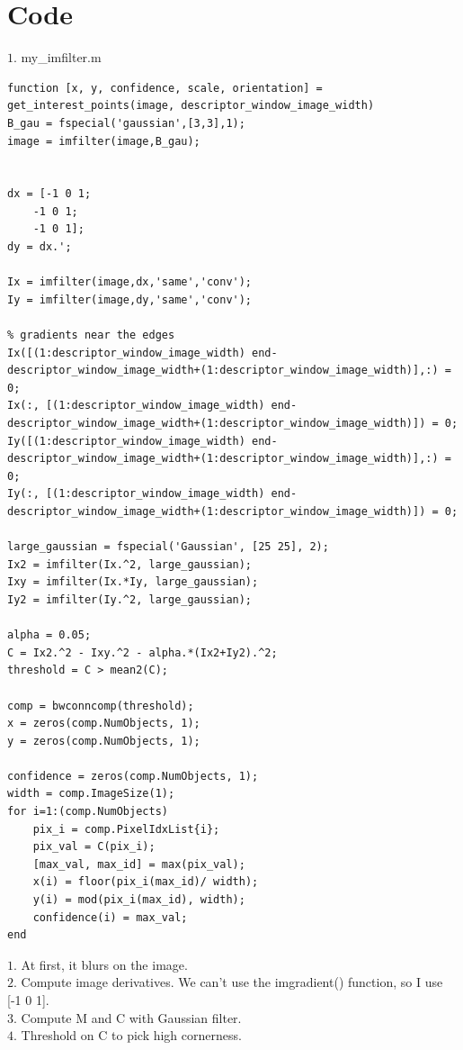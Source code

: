 \section*{Code}
{\large $1.$ my\_imfilter.m \par}
\begin{lstlisting}[style=Matlab-editor]
function [x, y, confidence, scale, orientation] = get_interest_points(image, descriptor_window_image_width)
B_gau = fspecial('gaussian',[3,3],1);
image = imfilter(image,B_gau);


dx = [-1 0 1;
    -1 0 1;
    -1 0 1];
dy = dx.';

Ix = imfilter(image,dx,'same','conv');
Iy = imfilter(image,dy,'same','conv');

% gradients near the edges
Ix([(1:descriptor_window_image_width) end-descriptor_window_image_width+(1:descriptor_window_image_width)],:) = 0;
Ix(:, [(1:descriptor_window_image_width) end-descriptor_window_image_width+(1:descriptor_window_image_width)]) = 0;
Iy([(1:descriptor_window_image_width) end-descriptor_window_image_width+(1:descriptor_window_image_width)],:) = 0;
Iy(:, [(1:descriptor_window_image_width) end-descriptor_window_image_width+(1:descriptor_window_image_width)]) = 0;

large_gaussian = fspecial('Gaussian', [25 25], 2);
Ix2 = imfilter(Ix.^2, large_gaussian);
Ixy = imfilter(Ix.*Iy, large_gaussian);
Iy2 = imfilter(Iy.^2, large_gaussian);

alpha = 0.05;
C = Ix2.^2 - Ixy.^2 - alpha.*(Ix2+Iy2).^2;
threshold = C > mean2(C);

comp = bwconncomp(threshold);
x = zeros(comp.NumObjects, 1);
y = zeros(comp.NumObjects, 1);

confidence = zeros(comp.NumObjects, 1);
width = comp.ImageSize(1);
for i=1:(comp.NumObjects)
    pix_i = comp.PixelIdxList{i};
    pix_val = C(pix_i);
    [max_val, max_id] = max(pix_val);
    x(i) = floor(pix_i(max_id)/ width);
    y(i) = mod(pix_i(max_id), width);
    confidence(i) = max_val;
end
\end{lstlisting}
$1.$ At first, it blurs on the image.\\
$2.$ Compute image derivatives. We can't use the imgradient() function, so I use [-1 0 1].\\
$3.$ Compute M and C with Gaussian filter.\\
$4.$ Threshold on C to pick high cornerness.\\

